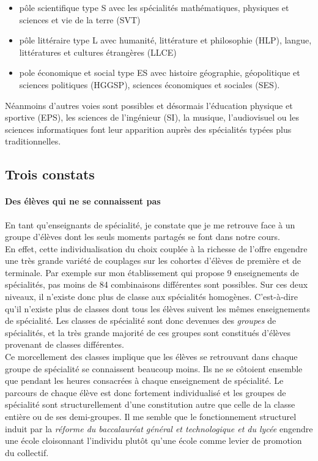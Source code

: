 \begin{itemize}
    \item pôle scientifique type S avec les spécialités mathématiques, physiques et sciences et vie de la terre (SVT)
    \item pôle littéraire type L avec humanité, littérature et philosophie (HLP), langue, littératures et cultures étrangères (LLCE)
    \item pole économique et social type ES avec histoire géographie, géopolitique et sciences politiques (HGGSP), sciences économiques et sociales (SES).
\end{itemize}

Néanmoins d'autres voies sont possibles et désormais l'éducation physique et sportive (EPS), les sciences de l'ingénieur (SI), la musique, l'audiovisuel ou les sciences informatiques font leur apparition auprès des spécialités typées plus traditionnelles.



\subsection{Trois constats}



\paragraph{Des élèves qui ne se connaissent pas}
%
En tant qu'enseignants de spécialité, je constate que je me retrouve face à un groupe d'élèves dont les seuls moments partagés se font dans notre cours. 
\\
En effet, cette individualisation du choix couplée à la richesse de l'offre engendre une très grande variété de couplages sur les cohortes d'élèves de première et de terminale. Par exemple sur mon établissement qui propose 9 enseignements de spécialités, pas moins de 84 combinaisons différentes sont possibles. Sur ces deux niveaux, il n'existe donc plus de classe aux spécialités homogènes. C'est-à-dire qu'il n'existe plus de classes dont tous les élèves suivent les mêmes enseignements de spécialité. Les classes de spécialité sont donc devenues des \emph{groupes} de spécialités, et la très grande majorité de ces groupes sont constitués d'élèves provenant de classes différentes.
\\
Ce morcellement des classes implique que les élèves se retrouvant dans chaque groupe de spécialité se connaissent beaucoup moins. Ils ne se côtoient ensemble que pendant les heures consacrées à chaque enseignement de spécialité. Le parcours de chaque élève est donc fortement individualisé et les groupes de spécialité sont structurellement d'une constitution autre que celle de la classe entière ou de ses demi-groupes. Il me semble que le fonctionnement structurel induit par la \emph{réforme du baccalauréat général et technologique et du lycée} engendre une école cloisonnant l'individu plutôt qu'une école comme levier de promotion du collectif. 


